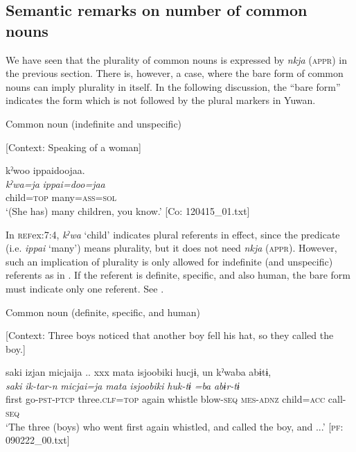 \subsection{Semantic remarks on number of common nouns}

We have seen that the plurality of common nouns is expressed by \textit{nkja} (\textsc{appr}) in the previous section. There is, however, a case, where the bare form of common nouns can imply plurality in itself. In the following discussion, the “bare form” indicates the form which is not followed by the plural markers in Yuwan.

\ea \label{ex:7:4}  Common noun (indefinite and unspecific)

  [Context: Speaking of a woman]

{\TM}
\glll  kˀwoo  ippaidoojaa.\\
\textit{kˀwa=ja}  \textit{ippai=doo=jaa}\\
child=\textsc{top}  many=\textsc{ass}=\textsc{sol}\\
\glt ‘(She has) many children, you know.’ [Co: 120415\_01.txt]

\z

In \textsc{ref}{ex:7:4}, \textit{kˀwa} ‘child’ indicates plural referents in effect, since the predicate (i.e. \textit{ippai} ‘many’) means plurality, but it does not need \textit{nkja} (\textsc{appr}). However, such an implication of plurality is only allowed for indefinite (and unspecific) referents as in . If the referent is definite, specific, and also human, the bare form must indicate only one referent. See .

\ea \label{ex:7:5}  Common noun (definite, specific, and human)

  [Context: Three boys noticed that another boy fell his hat, so they called the boy.]

{\TM}
\glll saki  izjan  micjaija ..  xxx  mata  isjoobiki  hucjɨ,  un  kˀwaba  abɨtɨ,\\
\textit{saki}  \textit{ik-tar-n}  \textit{micjai=ja}    \textit{mata}  \textit{isjoobiki}  \textit{huk-tɨ}  \textit{}  \textit{=ba}  \textit{abɨr-tɨ}\\
    first  go-\textsc{pst}-\textsc{ptcp}  three.\textsc{clf}=\textsc{top}    again  whistle  blow-\textsc{seq}  \textsc{mes}-\textsc{adnz}  child=\textsc{acc}  call-\textsc{seq}\\
\glt    ‘The three (boys) who went first again whistled, and called the boy, and ...’ [\textsc{pf}: 090222\_00.txt]


